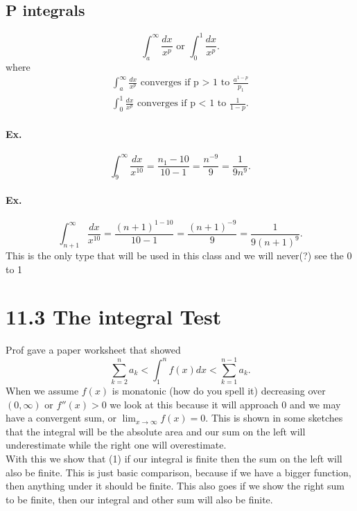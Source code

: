 \subsection{P integrals}%
\label{sub:P integrals}
\[
\int_{ a }^{ \infty } \frac{ dx }{ x^{ p } } \text{ or } \int_{ 0 }^{ 1 } \frac{ dx }{ x^{ p } }
.\] 
where
\begin{align*}
\int_{ a }^{ \infty } \frac{ dx }{ x^{ p } } \text{ converges if p > 1 to } \frac{ a^{ 1-p } }{ p_1 }\\
\int_{ 0 }^{ 1 } \frac{ dx }{ x^{ p } } \text{ converges if p < 1 to } \frac{ 1 }{ 1-p }
.\end{align*}

\paragraph{Ex.}
\[
\int_{ 9 }^{ \infty } \frac{ dx }{ x^{ 10 } } =\frac{ n_1-10 }{ 10-1 }=\frac{ n^{ -9 } }{ 9 } = \frac{ 1 }{ 9n^{ 9 } } 
.\] 

\paragraph{Ex.}
\[
\int_{ n+1 }^{ \infty } \frac{ dx }{ x^{ 10 } } = \frac{ \left( n+1 \right) ^{ 1-10 } }{ 10-1 }=\frac{ \left( n+1 \right) ^{ -9 } }{ 9 }=\frac{ 1 }{ 9\left( n+1 \right) ^{ 9 } } 
.\] 
This is the only type that will be used in this class and we will never(?) see the 0 to 1

\section{11.3 The integral Test}%
\label{sec:11.3 The integral Test}

Prof gave a paper worksheet that showed
\[
\sum_{ k=2 } ^{ n } a_k<\int_{ 1 }^{ n } f\left( x \right) dx<\sum_{ k=1 } ^{ n-1 } a_k
.\] 
When we assume $ f\left( x \right)  $ is monatonic (how do you spell it) decreasing over $ \left( 0,\infty \right)  $ or $ f''\left( x \right) >0 $ we look at this because it will approach 0 and we may have a convergent sum, or $ \lim_{ x \to \infty} f\left( x \right) =0 $. This is shown in some sketches that the integral will be the absolute area and our sum on the left will underestimate while the right one will overestimate. \\

With this we show that (1) if our integral is finite then the sum on the left will also be finite. This is just basic comparison, because if we have a bigger function, then anything under it should be finite. This also goes if we show the right sum to be finite, then our integral and other sum will also be finite. \\

